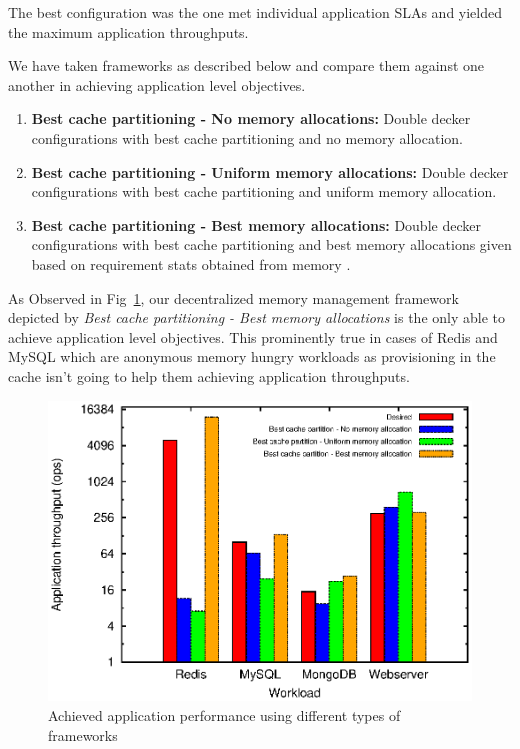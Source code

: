 	The best configuration was the one met individual application SLAs and yielded the maximum application 
	throughputs.	
		
	We have taken frameworks as described below and compare them against one another in achieving application level objectives.
	  \begin{enumerate}
	    \item \textbf{Best cache partitioning - No memory allocations:} Double decker configurations with best cache partitioning
	    and no memory allocation.
	    \item \textbf{Best cache partitioning - Uniform memory allocations:} Double decker configurations with best cache partitioning
	    and uniform memory allocation.
	    \item \textbf{Best cache partitioning - Best memory allocations:} Double decker configurations with best cache partitioning
	    and best memory allocations given based on requirement stats obtained from memory \cg{}.
	  \end{enumerate}
    
	As Observed in Fig~\ref{plot:dd_sdc_results}, our decentralized memory management framework depicted by 
	\textit{Best cache partitioning - Best memory allocations} is the only able to achieve application level 
	objectives. This prominently true in cases of Redis and MySQL which are anonymous memory hungry workloads
	as provisioning in the cache isn't going to help them achieving application throughputs.
	
	\begin{figure}
	  \centering
	  \includegraphics[scale=0.75]{images/dd_sdc_plot/sdc_dd.eps}
	  \caption{Achieved application performance using different types of frameworks}
	  \label{plot:dd_sdc_results}
	\end{figure}
	
